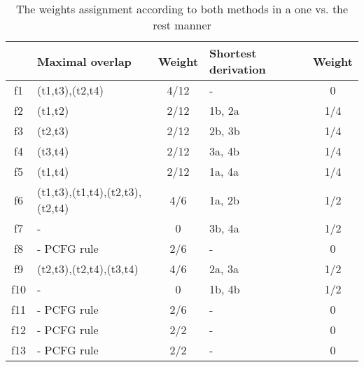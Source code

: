 \begin{table}[h!]
\center
\begin{tabular}{c|p{}c|p{}c|}
&Maximal overlap&Weight&Shortest derivation\footnotemark&Weight\\\hline
f1&(t1,t3),(t2,t4)&4/12&-&0\\
f2&(t1,t2)&2/12&1b, 2a&1/4\\
f3&(t2,t3)&2/12&2b, 3b&1/4\\
f4&(t3,t4)&2/12&3a, 4b&1/4\\
f5&(t1,t4)&2/12&1a, 4a&1/4\\
f6&(t1,t3),(t1,t4),(t2,t3),(t2,t4)&4/6&1a, 2b&1/2\\
f7&-&0&3b, 4a&1/2\\
f8&- PCFG rule&2/6&-&0\\
f9&(t2,t3),(t2,t4),(t3,t4)&4/6&2a, 3a&1/2\\
f10&-&0&1b, 4b&1/2\\
f11&-  PCFG rule&2/6&-&0\\
f12&- PCFG rule&2/2&-&0\\
f13&- PCFG rule&2/2&-&0\\
\end{tabular}
\caption{The weights assignment according to both methods in a one vs. the rest manner}
\label{t:weights}
\end{table}






